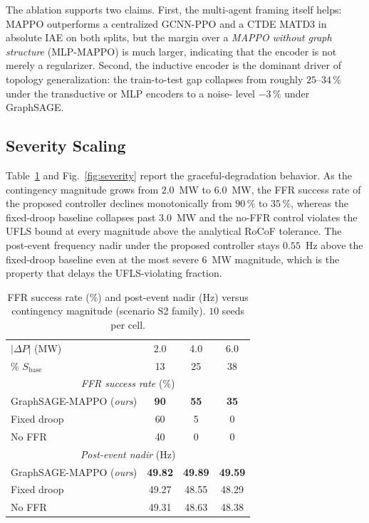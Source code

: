 The ablation supports two claims. First, the multi-agent framing
itself helps: MAPPO outperforms a centralized GCNN-PPO and a CTDE
MATD3 in absolute IAE on both splits, but the margin over a
\emph{MAPPO without graph structure} (MLP-MAPPO) is much larger,
indicating that the encoder is not merely a regularizer. Second,
the inductive encoder is the dominant driver of topology
generalization: the train-to-test gap collapses from roughly
$25$--$34$\,\% under the transductive or MLP encoders to a noise-
level $-3$\,\% under GraphSAGE.

\subsection{Severity Scaling}
\label{ssec:sev}

Table~\ref{tab:severity} and Fig.~\ref{fig:severity} report the
graceful-degradation behavior. As the contingency magnitude grows
from $2.0$~MW to $6.0$~MW, the FFR success rate of the proposed
controller declines monotonically from $90$\,\% to $35$\,\%, whereas
the fixed-droop baseline collapses past $3.0$~MW and the no-FFR
control violates the UFLS bound at every magnitude above the
analytical RoCoF tolerance. The post-event frequency nadir under
the proposed controller stays $0.55$~Hz above the fixed-droop
baseline even at the most severe $6$~MW magnitude, which is the
property that delays the UFLS-violating fraction.

\begin{table}[!t]
\caption{FFR success rate (\%) and post-event nadir (Hz) versus
contingency magnitude (scenario S2 family). $10$ seeds per cell.}
\label{tab:severity}
\centering
\footnotesize
\begin{tabular}{lccc}
\toprule
$|\Delta P|$ (MW)             & 2.0     & 4.0     & 6.0     \\
\% $S_{\mathrm{base}}$        & 13      & 25      & 38      \\
\midrule
\multicolumn{4}{c}{\emph{FFR success rate} (\%)} \\
\midrule
GraphSAGE-MAPPO (\emph{ours}) & \textbf{90} & \textbf{55} & \textbf{35} \\
Fixed droop                   & 60          & 5           & 0           \\
No FFR                        & 40          & 0           & 0           \\
\midrule
\multicolumn{4}{c}{\emph{Post-event nadir} (Hz)} \\
\midrule
GraphSAGE-MAPPO (\emph{ours}) & \textbf{49.82} & \textbf{49.89} & \textbf{49.59} \\
Fixed droop                   & 49.27          & 48.55          & 48.29          \\
No FFR                        & 49.31          & 48.63          & 48.38          \\
\bottomrule
\end{tabular}
\end{table}

